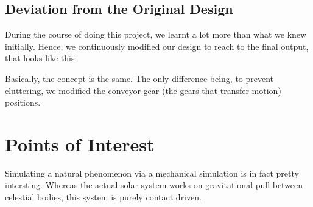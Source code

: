 \documentclass[12pt]{report}
\begin{document}
\section*{Deviation from the Original Design}
During the course of doing this project, we learnt a lot more than what we knew initially. Hence, we continuously modified our design to reach to the final output, that looks like this:
\begin{center}
\setlength\fboxsep{2pt}
\setlength\fboxrule{1pt}
\end{center}
Basically, the concept is the same. The only difference being, to prevent cluttering, we modified the conveyor-gear (the gears that transfer motion) positions. 

\pagebreak
\chapter*{Points of Interest}
Simulating a natural phenomenon via a mechanical simulation is in fact pretty intersting. Whereas the actual solar system works on gravitational pull between celestial bodies, this system is purely contact driven. 


\end{document}
